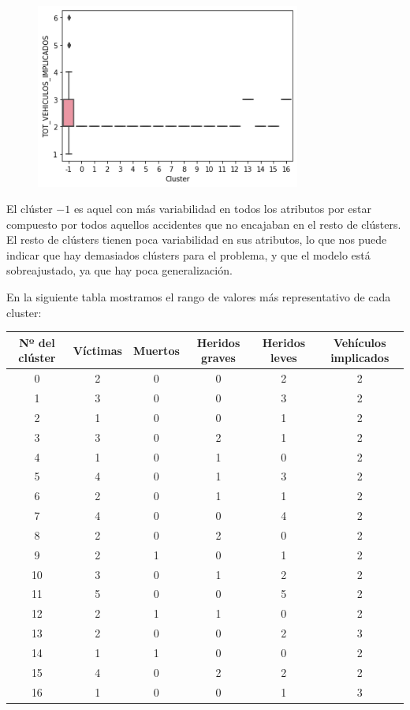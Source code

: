 \documentclass[a4]{article}
\begin{document}
\begin{figure}[H]
  \includegraphics[width=87mm]{imagenes/c1_dbscan_vi}
\end{figure}

El clúster $-1$ es aquel con más variabilidad en todos los atributos por estar compuesto por todos aquellos accidentes que no encajaban en el resto de clústers. El resto de clústers tienen poca variabilidad en sus atributos, lo que nos puede indicar que hay demasiados clústers para el problema, y que el modelo está sobreajustado, ya que hay poca generalización.

\newpage
En la siguiente tabla mostramos el rango de valores más representativo de cada cluster:

\begin{center}
\begin{tabular}{|c|c|c|c|c|c|}
\hline
\multicolumn{1}{|c|}{\textbf{Nº del clúster}} & \textbf{Víctimas} & \textbf{Muertos} & \textbf{Heridos graves} & \textbf{Heridos leves} & \textbf{Vehículos implicados}\\ \hline
  0  & 2 & 0 & 0 & 2 & 2 \\ \hline
  1  & 3 & 0 & 0 & 3 & 2 \\ \hline
  2  & 1 & 0 & 0 & 1 & 2 \\ \hline
  3  & 3 & 0 & 2 & 1 & 2 \\ \hline
  4  & 1 & 0 & 1 & 0 & 2 \\ \hline
  5  & 4 & 0 & 1 & 3 & 2 \\ \hline
  6  & 2 & 0 & 1 & 1 & 2 \\ \hline
  7  & 4 & 0 & 0 & 4 & 2 \\ \hline
  8  & 2 & 0 & 2 & 0 & 2 \\ \hline
  9  & 2 & 1 & 0 & 1 & 2 \\ \hline
 10  & 3 & 0 & 1 & 2 & 2 \\ \hline
 11  & 5 & 0 & 0 & 5 & 2 \\ \hline
 12  & 2 & 1 & 1 & 0 & 2 \\ \hline
 13  & 2 & 0 & 0 & 2 & 3 \\ \hline
 14  & 1 & 1 & 0 & 0 & 2 \\ \hline
 15  & 4 & 0 & 2 & 2 & 2 \\ \hline
 16  & 1 & 0 & 0 & 1 & 3 \\ \hline
\end{tabular}
\end{center}
\end{document}
